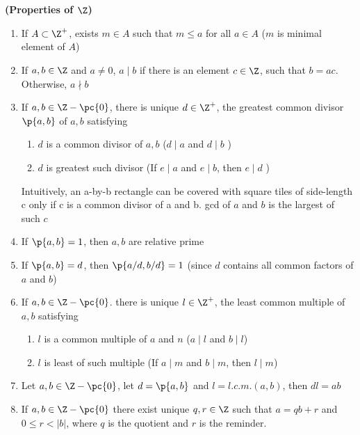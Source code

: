 \documentclass[11pt]{article}
\begin{document}
\newpage
\section{}

\begin{definition*}
    \textbf{(Properties of $\Z$)}
    \begin{enumerate}
        \item {} If $A \subset \Z^+$, exists $m\in A$ such that $m\leq a$ for all $a\in A$ ($m$ is minimal element of $A$)
        \item {} If $a,b\in \Z$ and $a\neq 0$, $a \mid b$ if there is an element $c\in \Z$, such that $b=ac$. Otherwise, $a\nmid b$ 
        \item {} If $a,b\in \Z - \pc{0}$, there is unique $d \in \Z^+$, the greatest common divisor $\p{a,b}$ of $a,b$ satisfying
        \begin{enumerate}
            \item $d$ is a common divisor of $a,b$ ($d\mid a$ and $d\mid b$ )
            \item $d$ is greatest such divisor (If $e \mid a$ and $e\mid b$, then $e\mid d$ )
        \end{enumerate}
        Intuitively, an a-by-b rectangle can be covered with square tiles of side-length c only if c is a common divisor of a and b. gcd of $a$ and $b$ is the largest of such $c$
        \item {} If $\p{a,b}=1$, then $a,b$ are relative prime
        \item {} If $\p{a,b} = d$, then $\p{a/d, b/d} = 1$ (since $d$ contains all common factors of $a$ and $b$)
        \item {} If $a,b\in \Z - \pc{0}$. there is unique $l\in \Z^+$, the least common multiple of $a,b$ satisfying 
        \begin{enumerate}
            \item $l$ is a common multiple of $a$ and $n$ ($a\mid l$ and $b\mid l$)
            \item $l$ is least of such multiple (If $a\mid m$ and $b\mid m$, then $l\mid m$)
        \end{enumerate} 
        \item {} Let $a,b\in \Z - \pc{0}$, let $d = \p{a,b}$ and $l = l.c.m.(a,b)$, then $dl=ab$
        \item {} If $a,b\in \Z - \pc{0}$ there exist unique $q,r\in \Z$ such that $a=qb+r$ and $0\leq r < |b|$, where $q$ is the quotient and $r$ is the reminder. 

\end{enumerate}
\end{definition*}
\end{document}
